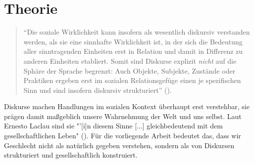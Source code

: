 \documentclass[12pt, titlepage=true, toc=bib]{scrartcl}
\begin{document}
\section{Theorie}

\begin{singlespace*}
\begin{quote}
"`Die soziale Wirklichkeit kann insofern als wesentlich diskursiv verstanden werden, als sie eine sinnhafte Wirklichkeit ist, in der sich die Bedeutung aller sinntragenden Einheiten erst in Relation und damit in Differenz zu anderen Einheiten etabliert. Somit sind Diskurse explizit \textit{nicht} auf die Sphäre der Sprache begrenzt: Auch Objekte, Subjekte, Zustände oder Praktiken ergeben erst im sozialen Relationsgefüge einen je spezifischen Sinn und sind insofern diskursiv strukturiert"' (\cite[9; Hervorh. im Orig.]{nonhoff_diskurs_2007-1}).
\end{quote}
\end{singlespace*}

\noindent Diskurse machen Handlungen im sozialen Kontext überhaupt erst verstehbar, sie prägen damit maßgeblich unsere Wahrnehmung der Welt und uns selbst. Laut Ernesto Laclau sind sie "'[i]n diesem Sinne [...] gleichbedeutend mit dem gesellschaftlichen Leben" (\cite[29]{nonhoff_ideologie_2007}). Für die vorliegende Arbeit bedeutet das, dass wir Geschlecht nicht als natürlich gegeben verstehen, sondern als von Diskursen strukturiert und gesellschaftlich konstruiert.
\end{document}
